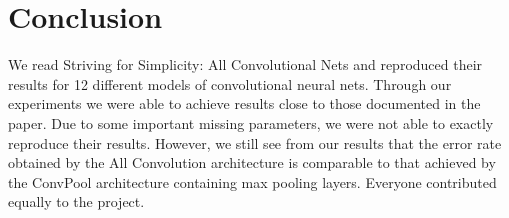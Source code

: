 \section{Conclusion}
We read Striving for Simplicity: All Convolutional Nets \cite{springenberg2014striving} and reproduced their results for 12 different models of convolutional neural nets. Through our experiments we were able to achieve results close to those documented in the paper. Due to some important missing parameters, we were not able to exactly reproduce their results. However, we still see from our results that the error rate obtained by the All Convolution architecture is comparable to that achieved by the ConvPool architecture containing max pooling layers. Everyone contributed equally to the project.